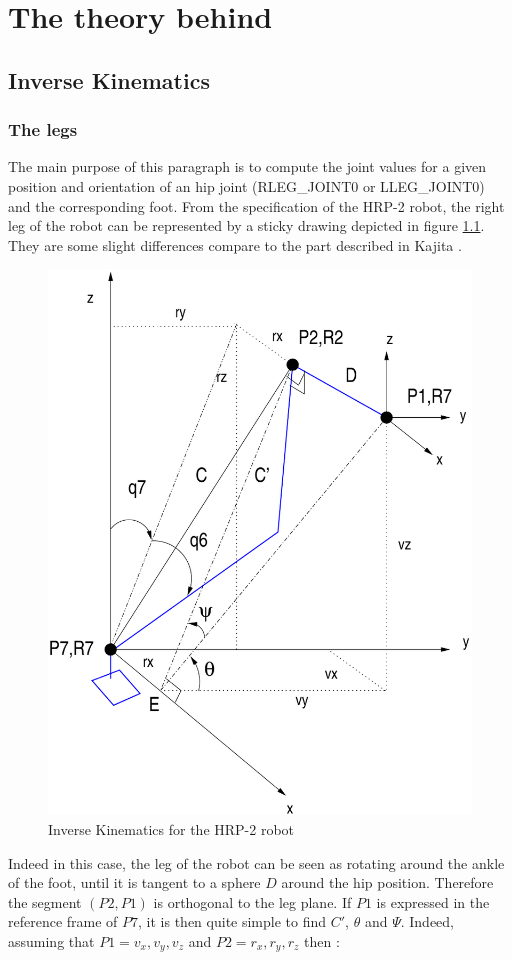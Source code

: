 \chapter{The theory behind}

\section{Inverse Kinematics}
\subsection{The legs}
The main purpose of this paragraph is to compute the joint values
for a given position and orientation of an hip joint (RLEG\_JOINT0
or LLEG\_JOINT0) and the corresponding foot. 
From the specification of the HRP-2 robot, the right leg of the robot
can be represented by a sticky drawing depicted in figure \ref{pic:InverseKinematicsforHRP2}.
They are some slight differences compare to the part described in Kajita \cite{Kajita2005}.
%
\begin{figure}[htb]
\begin{center}
\includegraphics[width=0.5\linewidth]{./figures/PatternGenerator/InverseKinematics2}
\caption{Inverse Kinematics for the HRP-2 robot}
\label{pic:InverseKinematicsforHRP2}
\end{center}
\end{figure}
%
Indeed in this case, the leg of the robot can be seen as rotating around the ankle of the foot,
until it is tangent to a sphere $D$ around the hip position.
Therefore the segment  $(P2,P1)$ is orthogonal to the leg plane.
If $P1$ is expressed in the reference frame of $P7$, it is then 
quite simple to find $C'$, $\theta$ and $\Psi$.
Indeed, assuming that $P1= { v_x, v_y, v_z}$ and $P2 = {r_x, r_y, r_z}$ then : 
